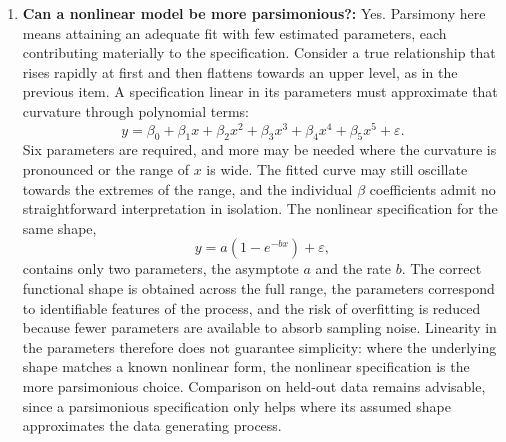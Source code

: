 \documentclass[conference]{IEEEtran}
\begin{document}
\begin{enumerate}
    \item \textbf{Can a nonlinear model be more parsimonious?:} Yes. Parsimony here means attaining an adequate fit with few estimated parameters, each contributing materially to the specification. Consider a true relationship that rises rapidly at first and then flattens towards an upper level, as in the previous item. A specification linear in its parameters must approximate that curvature through polynomial terms:
    \begin{equation}
        y = \beta_0 + \beta_1 x + \beta_2 x^2 + \beta_3 x^3 + \beta_4 x^4 + \beta_5 x^5 + \varepsilon.
    \end{equation}
    Six parameters are required, and more may be needed where the curvature is pronounced or the range of $x$ is wide. The fitted curve may still oscillate towards the extremes of the range, and the individual $\beta$ coefficients admit no straightforward interpretation in isolation. The nonlinear specification for the same shape,
    \begin{equation}
        y = a\left(1 - e^{-bx}\right) + \varepsilon,
    \end{equation}
    contains only two parameters, the asymptote $a$ and the rate $b$. The correct functional shape is obtained across the full range, the parameters correspond to identifiable features of the process, and the risk of overfitting is reduced because fewer parameters are available to absorb sampling noise. Linearity in the parameters therefore does not guarantee simplicity: where the underlying shape matches a known nonlinear form, the nonlinear specification is the more parsimonious choice. Comparison on held-out data remains advisable, since a parsimonious specification only helps where its assumed shape approximates the data generating process.


\end{enumerate}
\end{document}
